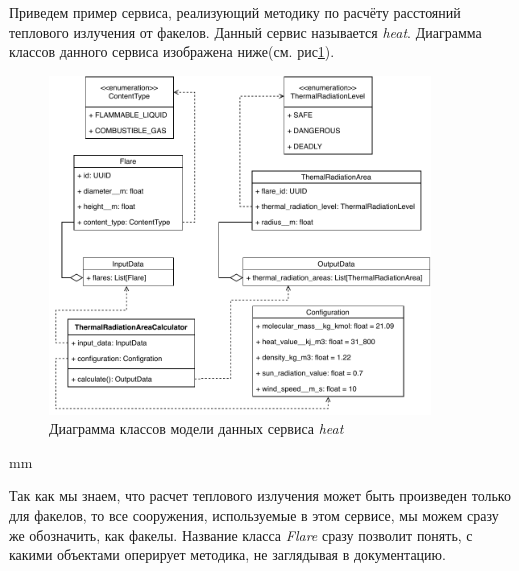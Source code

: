 Приведем пример сервиса, реализующий
методику по расчёту расстояний теплового излучения от факелов. Данный сервис называется \textit{heat}.
Диаграмма классов данного сервиса изображена ниже(см. рис\ref{pic:implementation__math-classes}).
\begin{figure}[H]
	\includegraphics[width=0.9\textwidth]{implementation/pictures/math/classes}
	\caption{Диаграмма классов модели данных сервиса \textit{heat}}
	\label{pic:implementation__math-classes}
\end{figure}
 mm

Так как мы знаем, что расчет теплового излучения может быть произведен только для факелов, то все сооружения,
используемые в этом сервисе, мы можем сразу же обозначить, как факелы. Название класса \textit{Flare} сразу позволит
понять, с какими объектами оперирует методика, не заглядывая в документацию.